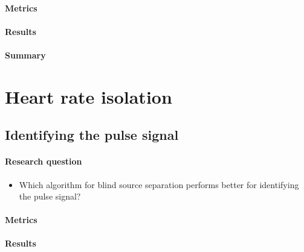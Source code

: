 \paragraph{Metrics}


\paragraph{Results}

\paragraph{Summary}


\section{Heart rate isolation}
\subsection{Identifying the pulse signal}
\label{section:bss}
\paragraph{Research question}
\begin{itemize}
    \item Which algorithm for blind source separation performs better for identifying the pulse signal?
\end{itemize}
\paragraph{Metrics}
\paragraph{Results}
